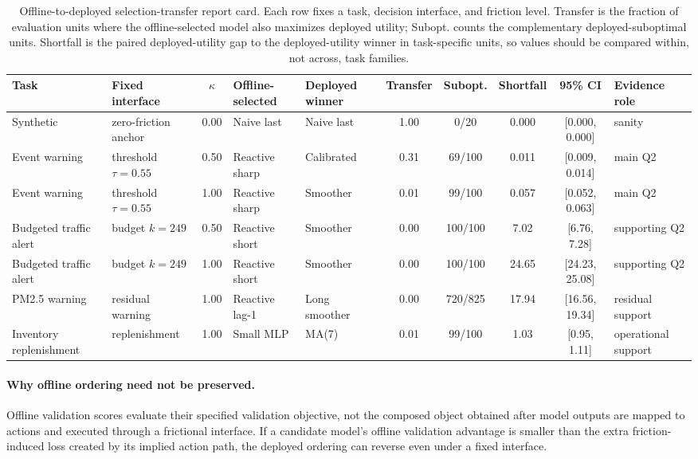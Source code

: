 \documentclass{article}
\begin{document}
\begin{table}[t]
\caption{Offline-to-deployed selection-transfer report card. Each row fixes a task, decision interface, and friction level. Transfer is the fraction of evaluation units where the offline-selected model also maximizes deployed utility; Subopt. counts the complementary deployed-suboptimal units. Shortfall is the paired deployed-utility gap to the deployed-utility winner in task-specific units, so values should be compared within, not across, task families.}
\label{tab:deployed-selection-report-card}
\centering
\scriptsize
\setlength{\tabcolsep}{2.5pt}
\begin{tabular*}{\textwidth}{@{\extracolsep{\fill}}llcllccccl@{}}
\toprule
Task & Fixed interface & $\kappa$ & Offline-selected & Deployed winner & Transfer & Subopt. & Shortfall & 95\% CI & Evidence role \\
\midrule
Synthetic & zero-friction anchor & 0.00 & Naive last & Naive last & 1.00 & 0/20 & 0.000 & [0.000, 0.000] & sanity \\
Event warning & threshold $\tau{=}0.55$ & 0.50 & Reactive sharp & Calibrated & 0.31 & 69/100 & 0.011 & [0.009, 0.014] & main Q2 \\
Event warning & threshold $\tau{=}0.55$ & 1.00 & Reactive sharp & Smoother & 0.01 & 99/100 & 0.057 & [0.052, 0.063] & main Q2 \\
Budgeted traffic alert & budget $k{=}249$ & 0.50 & Reactive short & Smoother & 0.00 & 100/100 & 7.02 & [6.76, 7.28] & supporting Q2 \\
Budgeted traffic alert & budget $k{=}249$ & 1.00 & Reactive short & Smoother & 0.00 & 100/100 & 24.65 & [24.23, 25.08] & supporting Q2 \\
PM2.5 warning & residual warning & 1.00 & Reactive lag-1 & Long smoother & 0.00 & 720/825 & 17.94 & [16.56, 19.34] & residual support \\
Inventory replenishment & replenishment & 1.00 & Small MLP & MA(7) & 0.01 & 99/100 & 1.03 & [0.95, 1.11] & operational support \\
\bottomrule
\end{tabular*}
\end{table}

\paragraph{Why offline ordering need not be preserved.} Offline validation scores evaluate their specified validation objective, not the composed object obtained after model outputs are mapped to actions and executed through a frictional interface. If a candidate model's offline validation advantage is smaller than the extra friction-induced loss created by its implied action path, the deployed ordering can reverse even under a fixed interface.
\end{document}
